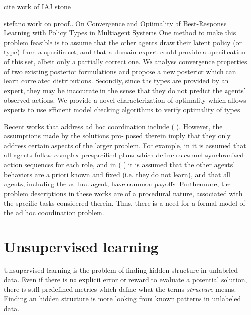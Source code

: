 cite work of IAJ stone



 stefano work on proof.. \cite{albrecht2014uai}
On Convergence and Optimality of Best-Response Learning with Policy Types in Multiagent Systems
One method to make this problem feasible is to assume that the other agents draw their latent policy (or type) from a specific set, and that a domain expert could provide a specification of this set, albeit only a partially correct one. We analyse convergence properties of two existing posterior formulations and propose a new posterior which can learn correlated distributions. Secondly, since the types are provided by an expert, they may be inaccurate in the sense that they do not predict the agents' observed actions. We provide a novel characterization of optimality which allows experts to use efficient model checking algorithms to verify optimality of types






Recent works that address ad hoc coordination include (\cite{bowling2005coordination} \cite{gil2006dynamically} \cite{stone2010ad}). However, the assumptions made by the solutions pro- posed therein imply that they only address certain aspects of the larger problem. For example, in  \cite{bowling2005coordination} \cite{gil2006dynamically} it is assumed that all agents follow complex prespecified plans which define roles and synchronised action sequences for each role, and in (\cite{stone2010teach} \cite{stone2013teaching}) it is assumed that the other agents' behaviors are a priori known and fixed (i.e. they do not learn), and that all agents, including the ad hoc agent, have common payoffs. Furthermore, the problem descriptions in these works are of a procedural nature, associated with the specific tasks considered therein. Thus, there is a need for a formal model of the ad hoc coordination problem.



\section{Unsupervised learning}

Unsupervised learning is the problem of finding hidden structure in unlabeled data. Even if there is no explicit error or reward to evaluate a potential solution, there is still predefined metrics which define what the terms \emph{structure} means. Finding an hidden structure is more looking from known patterns in unlabeled data.

